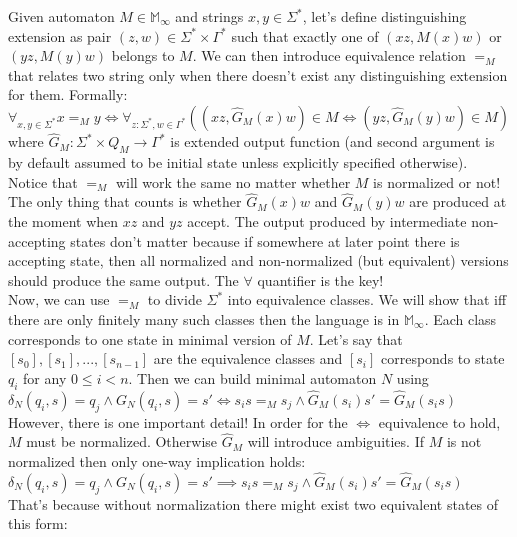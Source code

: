 \documentclass[12pt]{article}
\begin{document}
Given automaton $M\in\mathbb{ M}_\infty$ and strings $x,y\in\Sigma^*$, let's define distinguishing extension as pair $(z,w)\in\Sigma^* \times \Gamma^*$ such that exactly one of $(xz,M(x)w)$ or $(yz,M(y)w)$ belongs to $M$. We can then introduce equivalence relation $=_M$ that relates two string only when there doesn't exist any distinguishing extension for them. Formally: \\
$\forall_{x,y\in\Sigma^*} x=_M y \iff \forall_{z:\Sigma^*,w\in\Gamma^*} ((xz,\hat{G}_M(x)w) \in M \iff (yz,\hat{G}_M(y)w) \in M)$ \\
where $\hat{G}_M : \Sigma^* \times Q_M \rightarrow \Gamma^*$ is extended output function (and second argument is by default assumed to be initial state unless explicitly specified otherwise). \\
Notice that $=_M$ will work the same no matter whether $M$ is normalized or not! The only thing that counts is whether $\hat{G}_M(x)w$ and $\hat{G}_M(y)w$ are produced at the moment when $xz$ and $yz$ accept. The output produced by intermediate non-accepting states don't matter because if somewhere at later point there is accepting state, then all normalized and non-normalized (but equivalent) versions should produce the same output. The $\forall$ quantifier is the key!\\
Now, we can use $=_M$ to divide $\Sigma^*$ into equivalence classes. We will show that  iff there are only finitely many such classes then the language is in $\mathbb{ M}_\infty$.  Each class corresponds to one state in minimal version of $M$. Let's say that $[s_0],[s_1],...,[s_{n-1}]$ are the equivalence classes and $[s_i]$ corresponds to state $q_i$ for any $0\le i < n$. Then we can build minimal automaton $N$ using \\
$\delta_N(q_i,s)=q_j \wedge G_N(q_i,s)=s' \iff s_is =_M s_j \wedge \hat{G}_M(s_i)s' = \hat{G}_M(s_is)$ \\
 However, there is one important detail! In order for the $\iff$ equivalence to hold, $M$ must be normalized. Otherwise $ \hat{G}_M$ will introduce ambiguities. If $M$ is not normalized then only one-way implication holds: \\
 $\delta_N(q_i,s)=q_j \wedge G_N(q_i,s)=s' \implies s_is =_M s_j \wedge \hat{G}_M(s_i)s' = \hat{G}_M(s_is)$ \\
 That's because without normalization there might exist two equivalent states of this form:
\end{document}
